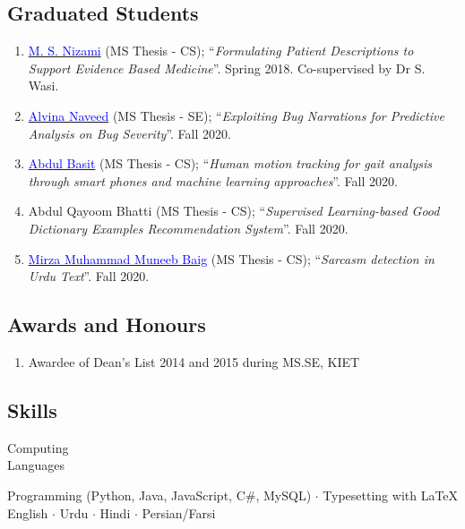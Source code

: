 \documentclass[a4paper, 10pt]{article}
\begin{document}
\subsection*{\textcolor{NavyBlue}{Graduated Students}}
\begin{enumerate}
\itemsep-4pt
\item \href{https://www.linkedin.com/in/msuffian/}{\textcolor{blue}{M. S. Nizami}} (MS Thesis - CS); ``{\it Formulating Patient Descriptions to Support Evidence Based Medicine}''. Spring 2018. Co-supervised by Dr S. Wasi.

\item \href{https://www.linkedin.com/in/alvina-naveed-7832a0117/}{\textcolor{blue}{Alvina Naveed}} (MS Thesis - SE); ``{\it Exploiting Bug Narrations for Predictive Analysis on Bug Severity}''. Fall 2020.

\item \href{https://www.linkedin.com/in/abdul-basit-a151b0b9/}{\textcolor{blue}{Abdul Basit}} (MS Thesis - CS); ``{\it Human motion tracking for gait analysis through smart phones and machine learning approaches}''. Fall 2020.

\item Abdul Qayoom Bhatti (MS Thesis - CS); ``{\it Supervised Learning-based Good Dictionary Examples Recommendation System}''. Fall 2020.

\item \href{}{\textcolor{blue}{Mirza Muhammad Muneeb Baig}} (MS Thesis - CS); ``{\it Sarcasm detection in Urdu Text}''. Fall 2020.
\end{enumerate}


\subsection*{\textcolor{NavyBlue}{Awards and Honours}}
\begin{enumerate}
\itemsep-4pt
\item Awardee of Dean's List 2014 and 2015 during MS.SE, KIET
\end{enumerate}


\subsection*{\textcolor{NavyBlue}{Skills}}
\hfill\begin{minipage}{0.17\textwidth}
Computing\textcolor{lightgray}{\dotfill}\\
Languages\textcolor{lightgray}{\dotfill}
\end{minipage}%
\begin{minipage}{0.8\textwidth}
Programming (Python, Java, JavaScript, C\#, MySQL) $\cdot$ Typesetting with \LaTeX\\
English $\cdot$ Urdu $\cdot$ Hindi $\cdot$ Persian/Farsi %
\end{minipage}
\end{document}
